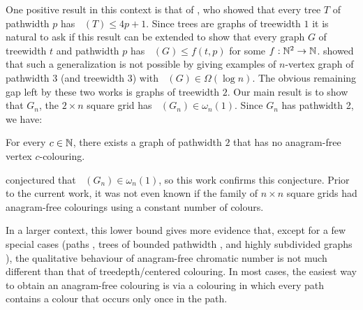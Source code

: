 \documentclass{patmorin}
\DeclareMathOperator{\afcn}{\dot{\chi}_\pi}
\begin{document}
One positive result in this context is that of
\citet{wilson.wood:anagram-free}, who showed that every tree $T$ of pathwidth $p$ has $\afcn(T)\le 4p+1$. Since trees are graphs of treewidth $1$ it is natural to ask if this result can be extended to show that every graph $G$ of treewidth $t$ and pathwidth $p$ has $\afcn(G)\le f(t,p)$ for some $f:\mathbb{N}^2\to\mathbb{N}$.  \citet{carmi.dujmovic.ea:anagram-free} showed that such a generalization is not possible by giving examples of $n$-vertex graph of pathwidth $3$ (and treewidth $3$) with $\afcn(G)\in\Omega(\log n)$.  The obvious remaining gap left by these two works is graphs of treewidth $2$. Our main result is to show that $G_n$, the $2\times n$ square grid has $\afcn(G_n)\in\omega_n(1)$. Since $G_n$ has pathwidth 2, we have:

\begin{thm}\label{main_vertex}
    For every $c\in\mathbb{N}$, there exists a graph of pathwidth $2$ that has no anagram-free vertex $c$-colouring.
\end{thm}

\citet{wilson:anagram-free} conjectured that $\afcn(G_n)\in\omega_n(1)$, so this work confirms this conjecture.  Prior to the current work, it was not even known if the family of $n\times n$ square grids had anagram-free colourings using a constant number of colours.

In a larger context, this lower bound gives more evidence that, except for a few special cases (paths \cite{evdokimov:strongly,pleasants:non-repetitive,keranen:abelian}, trees of bounded pathwidth \cite{wilson.wood:anagram-free}, and highly subdivided graphs \cite{wilson.wood:anagram-free2}), the qualitative behaviour of anagram-free chromatic number is not much different than that of treedepth/centered colouring.  In most cases, the easiest way to obtain an anagram-free colouring is via a colouring in which every path contains a colour that occurs only once in the path.

%
%
\end{document}
